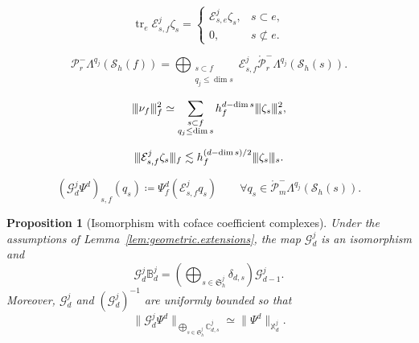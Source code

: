 \documentclass[10pt,a4paper]{amsart}
\newtheorem{proposition}{Proposition}
\newcommand{\PLtrim}[2]{\mathcal{P}_{#1}^{-}\Lambda^{#2}}
\newcommand{\PLtrimz}[2]{\mathring{\mathcal P}_{#1}^{-}\Lambda^{#2}}
\newcommand{\Sh}{\mathcal{S}_h}
\newcommand{\trc}{\operatorname{tr}}
\newcommand{\vvvert}{\vert\kern-0.25ex\vert\kern-0.25ex\vert}
\begin{document}
\begin{equation}
  \trc_e
  \mathcal E_{s,f}^j\zeta_s
  =
  \begin{cases}
    \mathcal E_{s,e}^j\zeta_s,
    &s\subset e,
    \\[1mm]
    0,
    &s\not\subset e.
  \end{cases}
\end{equation}

\begin{equation}
\PLtrim{r}{q_j}(\Sh(f))
=\bigoplus_{\substack{
s\subset f\\
q_j\leq\dim s
}}
\mathcal E_{s,f}^j
\PLtrimz{r}{q_j}(\Sh(s)).
\end{equation}

\begin{equation}
  \vvvert\nu_f\vvvert_f^2
  \simeq
  \sum_{\substack{
    s\subset f\\
    q_j\leq\dim s
  }}
  h_f^{d-\dim s}
  \vvvert\zeta_s\vvvert_s^2,
\end{equation}

\begin{equation}
  \vvvert
  \mathcal E_{s,f}^j\zeta_s
  \vvvert_f
  \lesssim
  h_f^{(d-\dim s)/2}
  \vvvert\zeta_s\vvvert_s.
\end{equation}

\begin{equation}\label{eq:geometric.coordinate.definition}
\left(\mathcal G_d^j\Psi^d\right)_{s,f}(q_s)
\coloneqq
\Psi_f^d\left(\mathcal E_{s,f}^jq_s\right)
\qquad
\forall q_s\in\PLtrimz{m}{q_j}(\Sh(s)).
\end{equation}

\begin{proposition}[Isomorphism with coface coefficient complexes]
\label{prop:functional.cochain.isomorphism}
Under the assumptions of Lemma~\ref{lem:geometric.extensions}, the map $\mathcal G_d^j$ is an isomorphism and
\begin{equation}\label{eq:cochain.commutativity}
\mathcal G_d^j\mathbb B_d^j
=
\left(
\bigoplus_{s\in\mathfrak S_h^j}\delta_{d,s}
\right)
\mathcal G_{d-1}^j.
\end{equation}
Moreover, $\mathcal G_d^j$ and $(\mathcal G_d^j)^{-1}$ are uniformly bounded so that
\begin{equation}\label{eq:coordinate.norm.equivalence}
\|\mathcal G_d^j\Psi^d\|_{
\bigoplus_{s\in\mathfrak S_h^j}\mathbb C_{d,s}^j
}
\simeq
\|\Psi^d\|_{\mathbb X_d^j}.
\end{equation}
\end{proposition}
\end{document}
